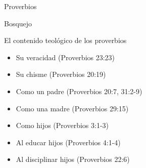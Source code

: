 \begin{section}{Proverbios}
\begin{subsection}{Bosquejo}
\begin{subsubsection}{El contenido teológico de los proverbios}
\begin{itemize}
\begin{itemize}
							\item Su veracidad (Proverbios 23:23)
							\item Su chisme (Proverbios 20:19)
							\item Como un padre (Proverbios 20:7, 31:2-9)
							\item Como una madre (Proverbios 29:15)
							\item Como hijos (Proverbios 3:1-3)
							\item Al educar hijos (Proverbios 4:1-4) 
							\item Al disciplinar hijos (Proverbios 22:6)
						\end{itemize}
				\end{itemize}
			\end{subsubsection}
		\end{subsection}
\end{section}
%


